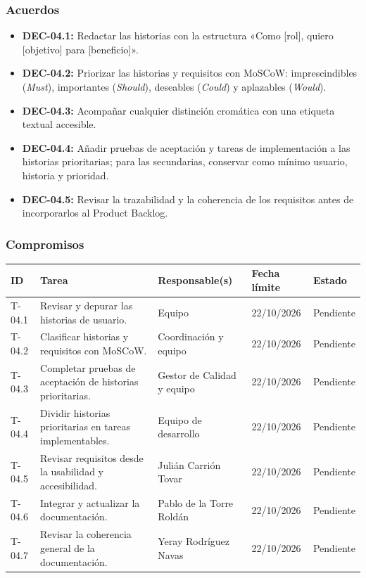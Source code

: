 \subsubsection{Acuerdos}
\begin{itemize}[leftmargin=*]
  \item \textbf{DEC-04.1:} Redactar las historias con la estructura «Como [rol], quiero [objetivo] para [beneficio]».
  \item \textbf{DEC-04.2:} Priorizar las historias y requisitos con MoSCoW: imprescindibles (\textit{Must}), importantes (\textit{Should}), deseables (\textit{Could}) y aplazables (\textit{Would}).
  \item \textbf{DEC-04.3:} Acompañar cualquier distinción cromática con una etiqueta textual accesible.
  \item \textbf{DEC-04.4:} Añadir pruebas de aceptación y tareas de implementación a las historias prioritarias; para las secundarias, conservar como mínimo usuario, historia y prioridad.
  \item \textbf{DEC-04.5:} Revisar la trazabilidad y la coherencia de los requisitos antes de incorporarlos al Product Backlog.
\end{itemize}

\subsubsection{Compromisos}
\begin{center}\footnotesize
\begin{tabularx}{\textwidth}{@{}p{}X p{}p{}p{}@{}}
\toprule
\rowcolor{tableHeader} ID & Tarea & Responsable(s) & Fecha límite & Estado \\
\midrule
T-04.1 & Revisar y depurar las historias de usuario. & Equipo & 22/10/2026 & Pendiente \\
T-04.2 & Clasificar historias y requisitos con MoSCoW. & Coordinación y equipo & 22/10/2026 & Pendiente \\
T-04.3 & Completar pruebas de aceptación de historias prioritarias. & Gestor de Calidad y equipo & 22/10/2026 & Pendiente \\
T-04.4 & Dividir historias prioritarias en tareas implementables. & Equipo de desarrollo & 22/10/2026 & Pendiente \\
T-04.5 & Revisar requisitos desde la usabilidad y accesibilidad. & Julián Carrión Tovar & 22/10/2026 & Pendiente \\
T-04.6 & Integrar y actualizar la documentación. & Pablo de la Torre Roldán & 22/10/2026 & Pendiente \\
T-04.7 & Revisar la coherencia general de la documentación. & Yeray Rodríguez Navas & 22/10/2026 & Pendiente \\
\bottomrule
\end{tabularx}
\end{center}

